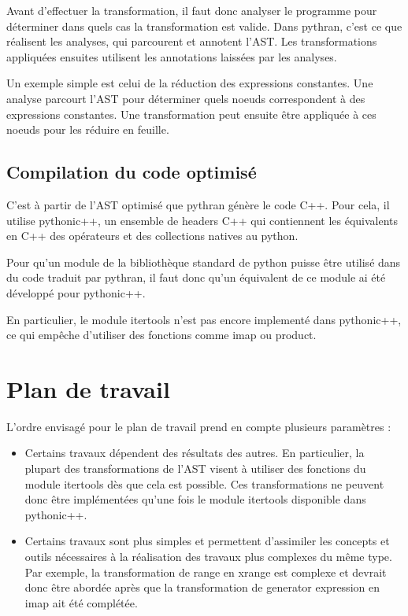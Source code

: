 \documentclass[a4paper]{article}
\begin{document}
Avant d'effectuer la transformation, il faut donc analyser le programme pour déterminer dans quels cas la transformation est valide. Dans pythran, c'est ce que réalisent les analyses, qui parcourent et annotent l'AST. Les transformations appliquées ensuites utilisent les annotations laissées par les analyses.

Un exemple simple est celui de la réduction des expressions constantes. Une analyse parcourt l'AST pour déterminer quels noeuds correspondent à des expressions constantes. Une transformation peut ensuite être appliquée à ces noeuds pour les réduire en feuille.

\subsection{Compilation du code optimisé}

\label{pythonicpp}

C'est à partir de l'AST optimisé que pythran génère le code C++. Pour cela, il utilise pythonic++, un ensemble de headers C++ qui contiennent les équivalents en C++ des opérateurs et des collections natives au python. 

Pour qu'un module de la bibliothèque standard de python puisse être utilisé dans du code traduit par pythran, il faut donc qu'un équivalent de ce module ai été développé pour pythonic++.

En particulier, le module itertools n'est pas encore implementé dans pythonic++, ce qui empêche d'utiliser des fonctions comme imap ou product.

\section{Plan de travail}

L'ordre envisagé pour le plan de travail prend en compte plusieurs paramètres :

\begin{itemize}
\item Certains travaux dépendent des résultats des autres. En particulier, la plupart des transformations de l'AST visent à utiliser des fonctions du module itertools dès que cela est possible. Ces transformations ne peuvent donc être implémentées qu'une fois le module itertools disponible dans pythonic++.
\item Certains travaux sont plus simples et permettent d'assimiler les concepts et outils nécessaires à la réalisation des travaux plus complexes du même type. Par exemple, la transformation de range en xrange est complexe et devrait donc être abordée après que la transformation de generator expression en imap ait été complétée.
\end{itemize}
\end{document}
